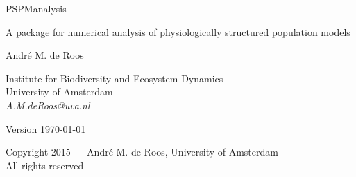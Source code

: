 \frontmatter
\begin{titlingpage}
\vspace*{\fill}
\begin{center}
\HUGE\textsf{PSPManalysis}\par
\end{center}
\vspace*{12pt}
\begin{center}
\LARGE\textsf{A package for numerical analysis of physiologically structured population models}\par
\end{center}
\vspace*{12pt}
\begin{center}
\LARGE\textsf{Andr\'e M. de Roos}\par
\bigskip
\Large\textsf{Institute for Biodiversity and Ecosystem Dynamics \\
University of Amsterdam \\
\bigskip
\textsl{A.M.deRoos@uva.nl} }\par
\vspace*{120pt}
Version \today
\end{center}
\vspace*{\fill}

\clearpage

\vspace*{\fill}\vspace*{\fill}
\begingroup
\setlength{\parindent}{0pt}
Copyright \textcopyright{} 2015 --- Andr\'e M. de Roos, University of Amsterdam\\
All rights reserved

\endgroup
\vspace*{\fill}
\end{titlingpage}

\mainmatter

